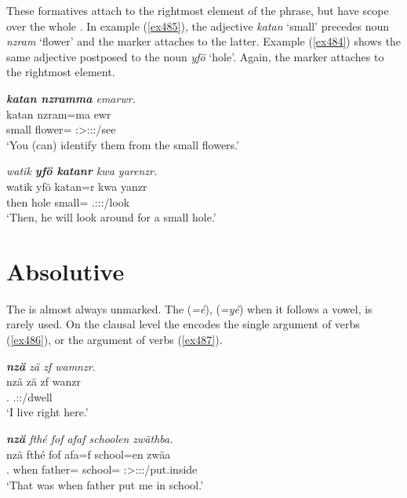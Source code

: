 These formatives attach to the rightmost element of the phrase, but have scope over the whole . In example (\ref{ex485}), the adjective \emph{katan} `small' precedes noun \emph{nzram} `flower' and the  marker attaches to the latter. Example (\ref{ex484}) shows the same adjective postposed to the noun \emph{yfö} `hole'. Again, the  marker attaches to the rightmost element.

\begin{exe}
	\ex \emph{\textbf{katan nzramma} emarwr.}\\
	\gll katan nzram=ma ewr\\
	small flower=\Char{} \Stsg:\Sbj>\Stpl:\Obj:\Nonpast:\Ipfv/see\\
	\trans `You (can) identify them from the small flowers.'
	\label{ex485}
\end{exe}
\begin{exe}
	\ex \emph{watik \textbf{yfö katanr} kwa yarenzr.}\\
	\gll watik yfö katan=r kwa yanzr\\
	then hole small=\Purp{} \Fut{} \Tsg.\Masc:\Sbj:\Nonpast:\Ipfv/look\\
	\trans `Then, he will look around for a small hole.'
	\label{ex484}
\end{exe}

\section{Absolutive}\label{abscase}

The   is almost always unmarked. The   (\emph{=é}), (\emph{=yé}) when it follows a vowel, is rarely used. On the clausal level the  encodes the single argument of  verbs (\ref{ex486}), or the  argument of  verbs (\ref{ex487}).

\begin{exe}
	\ex \emph{\textbf{nzä} zä zf wamnzr.}\\
	\gll nzä zä zf wanzr\\
	\Fsg.\Abs{} \Prox{} \Imm{} \Fsg.\Sbj:\Nonpast:\Ipfv/dwell\\
	\trans `I live right here.'
	\label{ex486}
\end{exe}
\begin{exe}
	\ex \emph{\textbf{nzä} fthé fof afaf schoolen zwäthba.}\\
	\gll nzä fthé fof afa=f school=en zwäa\\
	\Fsg.\Abs{} when \Emph{} father=\Erg{} school=\Loc{} \Stsg:\Sbj>\Fsg:\Obj:\Pst:\Pfv/put.inside\\
	\trans `That was when father put me in school.'
	\label{ex487}
\end{exe}
	
